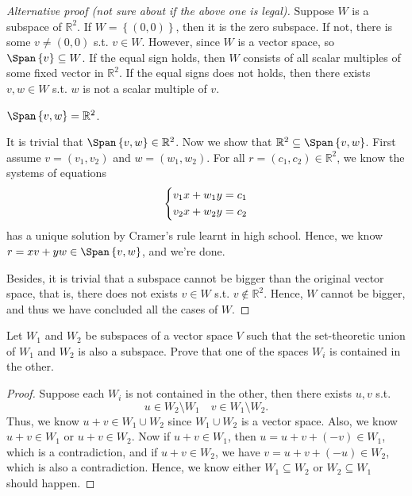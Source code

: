 \begin{proof}[Alternative proof (not sure about if the above one is legal)]
Suppose \(W\) is a subspace of \(\mathbb{R}^2\). If \(W=\left\{ (0,0) \right\} \), then it is the zero subspace. If not, there is some \(v \neq (0, 0)\) s.t. \(v \in W\). However, since \(W\) is a vector space, so \(\Span \left\{ v \right\} \subseteq  W\). If the equal sign holds, then \(W\) consists of all scalar multiples of some fixed vector in \(\mathbb{R} ^2\). If the equal signs does not holds, then there exists \(v, w \in W\) s.t. \(w\) is not a scalar multiple of \(v\). 
\begin{claim}
    \(\Span \left\{ v, w \right\} = \mathbb{R} ^2\). 
\end{claim}
\begin{explanation}
    It is trivial that \(\Span \left\{ v, w \right\} \in \mathbb{R} ^2 \). Now we show that \(\mathbb{R} ^2 \subseteq \Span \left\{ v,w \right\} \). First assume \(v = (v_1, v_2)\) and \(w = (w_1, w_2)\). For all \(r = (c_1, c_2) \in \mathbb{R} ^2\), we know the systems of equations    
    \[
        \begin{dcases}
            v_1 x + w_1 y = c_1 \\
            v_2 x + w_2 y = c_2
        \end{dcases}
    \]
    has a unique solution by Cramer's rule learnt in high school. Hence, we know \(r = x v + y w \in \Span \left\{ v, w \right\} \), and we're done.
\end{explanation}

Besides, it is trivial that a subspace cannot be bigger than the original vector space, that is, there does not exists \(v \in W\) s.t. \(v \notin \mathbb{R} ^2\). Hence, \(W\) cannot be bigger, and thus we have concluded all the cases of \(W\).    
\end{proof}

\begin{problem}
Let \(W_1\) and \(W_2\) be subspaces of a vector space \(V\) such that the set-theoretic union of \(W_1\) and \(W_2\) is also a subspace. Prove that one of the spaces \(W_i\) is contained in the other.
\end{problem}
\begin{proof}
    Suppose each \(W_i\) is not contained in the other, then there exists \(u, v\) s.t. 
    \[
        u \in W_2 \setminus W_1 \quad v \in W_1 \setminus W_2. 
    \]  
    Thus, we know \(u + v \in W_1 \cup W_2\) since \(W_1 \cup W_2\) is a vector space. Also, we know \(u + v \in W_1\) or \(u + v \in W_2\). Now if \(u + v \in W_1\), then \(u = u+v + (-v) \in W_1\), which is a contradiction, and if \(u + v \in W_2\), we have \(v = u + v + (-u) \in W_2\), which is also a contradiction. Hence, we know either \(W_1 \subseteq W_2\) or \(W_2 \subseteq W_1\) should happen.        
\end{proof}

